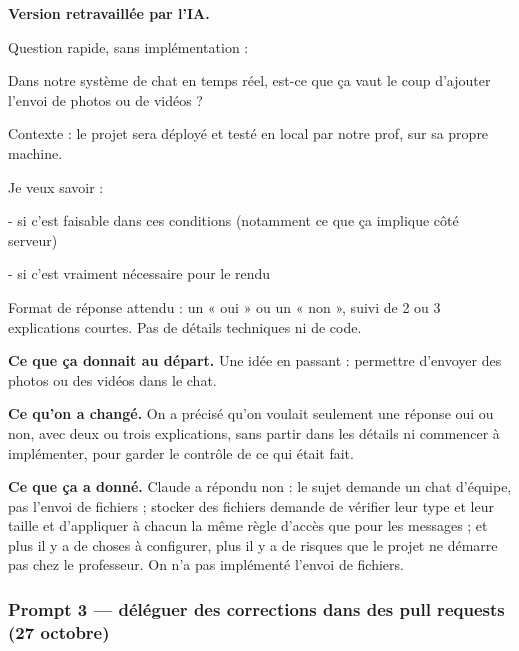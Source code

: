 \documentclass[11pt,a4paper]{article}
\begin{document}
\begin{prompt}
\textbf{Version retravaillée par l'IA.}\par\vspace{0.3em}
\setlength{\parskip}{0.15em}
Question rapide, sans implémentation :\par
\vspace{0.45em}
Dans notre système de chat en temps réel, est-ce que ça vaut le coup d'ajouter l'envoi de photos ou de vidéos ?\par
\vspace{0.45em}
Contexte : le projet sera déployé et testé en local par notre prof, sur sa propre machine.\par
\vspace{0.45em}
Je veux savoir :\par
- si c'est faisable dans ces conditions (notamment ce que ça implique côté serveur)\par
- si c'est vraiment nécessaire pour le rendu\par
\vspace{0.45em}
Format de réponse attendu : un « oui » ou un « non », suivi de 2 ou 3 explications courtes. Pas de détails techniques ni de code.\par
\end{prompt}

\textbf{Ce que ça donnait au départ.} Une idée en passant : permettre d'envoyer des photos ou des vidéos dans le chat.

\textbf{Ce qu'on a changé.} On a précisé qu'on voulait seulement une réponse oui ou non, avec deux ou trois explications, sans partir dans les détails ni commencer à implémenter, pour garder le contrôle de ce qui était fait.

\textbf{Ce que ça a donné.} Claude a répondu non : le sujet demande un chat d'équipe, pas l'envoi de fichiers ; stocker des fichiers demande de vérifier leur type et leur taille et d'appliquer à chacun la même règle d'accès que pour les messages ; et plus il y a de choses à configurer, plus il y a de risques que le projet ne démarre pas chez le professeur. On n'a pas implémenté l'envoi de fichiers.

\subsubsection*{Prompt 3 — déléguer des corrections dans des pull requests (27 octobre)}
\end{document}
